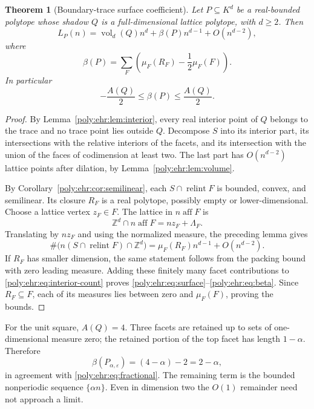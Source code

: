 \documentclass[11pt,a4paper]{article}
\numberwithin{equation}{section}
\newtheorem{theorem}{Theorem}[section]
\theoremstyle{plain}
\newcommand{\Z}{\mathbb Z}
\newcommand{\eps}{\varepsilon}
\newcommand{\aff}{\operatorname{aff}}
\newcommand{\relint}{\operatorname{relint}}
\newcommand{\vol}{\operatorname{vol}}
\begin{document}
\begin{theorem}[Boundary-trace surface coefficient]\label{poly:ehr:thm:surface}
Let $P\subseteq K^d$ be a real-bounded polytope whose shadow $Q$ is a
full-dimensional lattice polytope, with $d\geq2$. Then
\begin{equation}\label{poly:ehr:eq:surface}
 L_P(n)=\vol_d(Q)n^d+\beta(P)n^{d-1}+O(n^{d-2}),
\end{equation}
where
\begin{equation}\label{poly:ehr:eq:beta}
 \boxed{\displaystyle
 \beta(P)=\sum_F\left(\mu_F(R_F)-\frac12\mu_F(F)\right).}
\end{equation}
In particular
\begin{equation}\label{poly:ehr:eq:beta-bounds}
 -\frac{A(Q)}2\leq\beta(P)\leq\frac{A(Q)}2.
\end{equation}
\end{theorem}
\begin{proof}
By Lemma~\ref{poly:ehr:lem:interior}, every real interior point of $Q$ belongs to
the trace and no trace point lies outside $Q$. Decompose $S$ into its
interior part, its intersections with the relative interiors of the
facets, and its intersection with the union of the faces of codimension
at least two. The last part has $O(n^{d-2})$ lattice points after dilation,
by Lemma~\ref{poly:ehr:lem:volume}.

By Corollary~\ref{poly:ehr:cor:semilinear}, each
$S\cap\relint F$ is bounded, convex, and semilinear. Its closure $R_F$
is a real polytope, possibly empty or lower-dimensional. Choose a lattice
vertex $z_F\in F$. The lattice in $n\aff F$ is
\[
 \Z^d\cap n\aff F=nz_F+\Lambda_F.
\]
Translating by $nz_F$ and using the normalized measure, the preceding
lemma gives
\[
 \#\bigl(n(S\cap\relint F)\cap\Z^d\bigr)
   =\mu_F(R_F)n^{d-1}+O(n^{d-2}).
\]
If $R_F$ has smaller dimension, the same statement follows from the
packing bound with zero leading measure. Adding these finitely many
facet contributions to \eqref{poly:ehr:eq:interior-count} proves
\eqref{poly:ehr:eq:surface}--\eqref{poly:ehr:eq:beta}. Since $R_F\subseteq F$, each of its
measures lies between zero and $\mu_F(F)$, proving the bounds.
\end{proof}

\begin{example}
For the unit square, $A(Q)=4$. Three facets are retained up to sets of
one-dimensional measure zero; the retained portion of the top facet has
length $1-\alpha$. Therefore
\[
 \beta(P_{\alpha,\eps})=(4-\alpha)-2=2-\alpha,
\]
in agreement with \eqref{poly:ehr:eq:fractional}. The remaining term is the bounded
nonperiodic sequence $\{\alpha n\}$. Even in dimension two the $O(1)$
remainder need not approach a limit.
\end{example}
\end{document}

